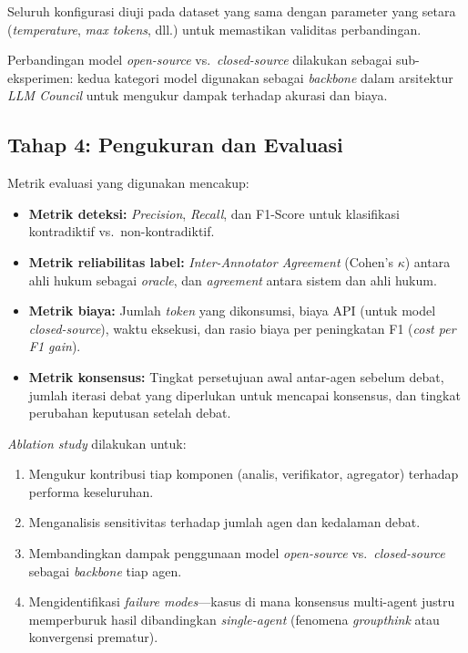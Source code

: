 Seluruh konfigurasi diuji pada dataset yang sama dengan parameter yang setara (\textit{temperature}, \textit{max tokens}, dll.) untuk memastikan validitas perbandingan.

Perbandingan model \textit{open-source} vs.\ \textit{closed-source} dilakukan sebagai sub-eksperimen: kedua kategori model digunakan sebagai \textit{backbone} dalam arsitektur \textit{LLM Council} untuk mengukur dampak terhadap akurasi dan biaya.

\subsection{Tahap 4: Pengukuran dan Evaluasi}

Metrik evaluasi yang digunakan mencakup:
\begin{itemize}
	\item \textbf{Metrik deteksi:} \textit{Precision}, \textit{Recall}, dan F1-Score untuk klasifikasi kontradiktif vs.\ non-kontradiktif.
	\item \textbf{Metrik reliabilitas label:} \textit{Inter-Annotator Agreement} (Cohen's $\kappa$) antara ahli hukum sebagai \textit{oracle}, dan \textit{agreement} antara sistem dan ahli hukum.
	\item \textbf{Metrik biaya:} Jumlah \textit{token} yang dikonsumsi, biaya API (untuk model \textit{closed-source}), waktu eksekusi, dan rasio biaya per peningkatan F1 (\textit{cost per F1 gain}).
	\item \textbf{Metrik konsensus:} Tingkat persetujuan awal antar-agen sebelum debat, jumlah iterasi debat yang diperlukan untuk mencapai konsensus, dan tingkat perubahan keputusan setelah debat.
\end{itemize}

\textit{Ablation study} dilakukan untuk:
\begin{enumerate}
	\item Mengukur kontribusi tiap komponen (analis, verifikator, agregator) terhadap performa keseluruhan.
	\item Menganalisis sensitivitas terhadap jumlah agen dan kedalaman debat.
	\item Membandingkan dampak penggunaan model \textit{open-source} vs.\ \textit{closed-source} sebagai \textit{backbone} tiap agen.
	\item Mengidentifikasi \textit{failure modes}—kasus di mana konsensus multi-agent justru memperburuk hasil dibandingkan \textit{single-agent} (fenomena \textit{groupthink} atau konvergensi prematur).
\end{enumerate}

